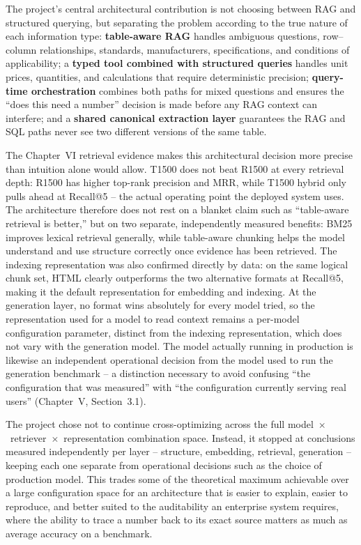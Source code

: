 \documentclass[11pt,a4paper]{article}
\begin{document}
The project's central architectural contribution is not choosing between
RAG and structured querying, but separating the problem according to the
true nature of each information type: \textbf{table-aware RAG} handles
ambiguous questions, row--column relationships, standards, manufacturers,
specifications, and conditions of applicability; a \textbf{typed tool
combined with structured queries} handles unit prices, quantities, and
calculations that require deterministic precision; \textbf{query-time
orchestration} combines both paths for mixed questions and ensures the
``does this need a number'' decision is made before any RAG context can
interfere; and a \textbf{shared canonical extraction layer} guarantees the
RAG and SQL paths never see two different versions of the same table.

The Chapter~VI retrieval evidence makes this architectural decision more
precise than intuition alone would allow. T1500 does not beat R1500 at
every retrieval depth: R1500 has higher top-rank precision and MRR, while
T1500 hybrid only pulls ahead at Recall@5 -- the actual operating point the
deployed system uses. The architecture therefore does not rest on a blanket
claim such as ``table-aware retrieval is better,'' but on two separate,
independently measured benefits: BM25 improves lexical retrieval generally,
while table-aware chunking helps the model understand and use structure
correctly once evidence has been retrieved. The indexing representation was
also confirmed directly by data: on the same logical chunk set, HTML
clearly outperforms the two alternative formats at Recall@5, making it the
default representation for embedding and indexing. At the generation layer,
no format wins absolutely for every model tried, so the representation used
for a model to read context remains a per-model configuration parameter,
distinct from the indexing representation, which does not vary with the
generation model. The model actually running in production is likewise an
independent operational decision from the model used to run the generation
benchmark -- a distinction necessary to avoid confusing ``the configuration
that was measured'' with ``the configuration currently serving real users''
(Chapter~V, Section~3.1).

The project chose not to continue cross-optimizing across the full
model~$\times$~retriever~$\times$~representation combination space.
Instead, it stopped at conclusions measured independently per layer --
structure, embedding, retrieval, generation -- keeping each one separate
from operational decisions such as the choice of production model. This
trades some of the theoretical maximum achievable over a large configuration
space for an architecture that is easier to explain, easier to reproduce,
and better suited to the auditability an enterprise system requires, where
the ability to trace a number back to its exact source matters as much as
average accuracy on a benchmark.
\end{document}
